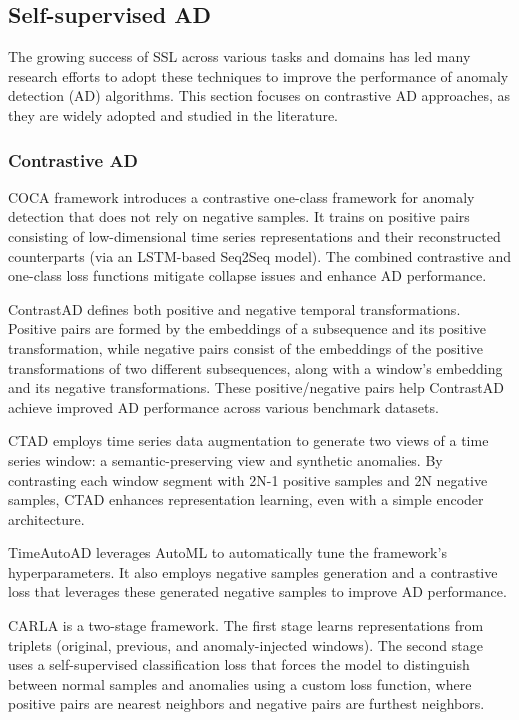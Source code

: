 \subsection{Self-supervised AD}
The growing success of \ac{SSL} across various tasks and domains has led many research efforts to adopt these techniques to improve the performance of anomaly detection (AD) algorithms. This section focuses on contrastive AD approaches, as they are widely adopted and studied in the literature.


\subsubsection{Contrastive AD} %
\ac{COCA} framework \cite{wang2023deep} introduces a contrastive one-class framework for anomaly detection that does not rely on negative samples. It trains on positive pairs consisting of low-dimensional time series representations and their reconstructed counterparts (via an LSTM-based Seq2Seq model). The combined contrastive and one-class loss functions mitigate collapse issues and enhance AD performance.  

ContrastAD \cite{li2023contrastive} defines both positive and negative temporal transformations. Positive pairs are formed by the embeddings of a subsequence and its positive transformation, while negative pairs consist of the embeddings of the positive transformations of two different subsequences, along with a window's embedding and its negative transformations. These positive/negative pairs help ContrastAD achieve improved AD performance across various benchmark datasets.

\ac{CTAD} \cite{kim2023contrastive} employs time series data augmentation to generate two views of a time series window: a semantic-preserving view and synthetic anomalies. By contrasting each window segment with 2N-1 positive samples and 2N negative samples, CTAD enhances representation learning, even with a simple encoder architecture.

TimeAutoAD \cite{jiao2022timeautoad} leverages AutoML to automatically tune the framework's hyperparameters. It also employs negative samples generation and a contrastive loss that leverages these generated negative samples to improve AD performance.

CARLA \cite{DARBAN2025110874} is a two-stage framework. The first stage learns representations from triplets (original, previous, and anomaly-injected windows). The second stage uses a self-supervised classification loss that forces the model to distinguish between normal samples and anomalies using a custom loss function, where positive pairs are nearest neighbors and negative pairs are furthest neighbors.

